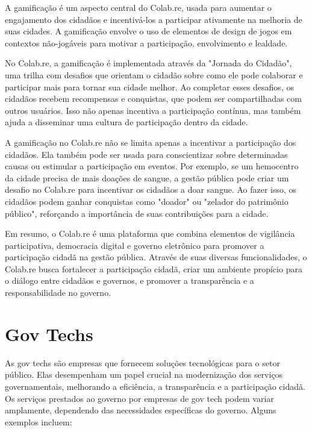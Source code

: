 A gamificação é um aspecto central do Colab.re, usada para aumentar o engajamento dos cidadãos e incentivá-los a participar ativamente na melhoria de suas cidades. A gamificação envolve o uso de elementos de design de jogos em contextos não-jogáveis para motivar a participação, envolvimento e lealdade.

No Colab.re, a gamificação é implementada através da "Jornada do Cidadão", uma trilha com desafios que orientam o cidadão sobre como ele pode colaborar e participar mais para tornar sua cidade melhor. Ao completar esses desafios, os cidadãos recebem recompensas e conquistas, que podem ser compartilhadas com outros usuários. Isso não apenas incentiva a participação contínua, mas também ajuda a disseminar uma cultura de participação dentro da cidade.

A gamificação no Colab.re não se limita apenas a incentivar a participação dos cidadãos. Ela também pode ser usada para conscientizar sobre determinadas causas ou estimular a participação em eventos. Por exemplo, se um hemocentro da cidade precisa de mais doações de sangue, a gestão pública pode criar um desafio no Colab.re para incentivar os cidadãos a doar sangue. Ao fazer isso, os cidadãos podem ganhar conquistas como "doador" ou "zelador do patrimônio público", reforçando a importância de suas contribuições para a cidade.

Em resumo, o Colab.re é uma plataforma que combina elementos de vigilância participativa, democracia digital e governo eletrônico para promover a participação cidadã na gestão pública. Através de suas diversas funcionalidades, o Colab.re busca fortalecer a participação cidadã, criar um ambiente propício para o diálogo entre cidadãos e governos, e promover a transparência e a responsabilidade no governo.

\section*{Gov Techs}
As gov techs são empresas que fornecem soluções tecnológicas para o setor público. Elas desempenham um papel crucial na modernização dos serviços governamentais, melhorando a eficiência, a transparência e a participação cidadã. Os serviços prestados ao governo por empresas de gov tech podem variar amplamente, dependendo das necessidades específicas do governo. Alguns exemplos incluem:

